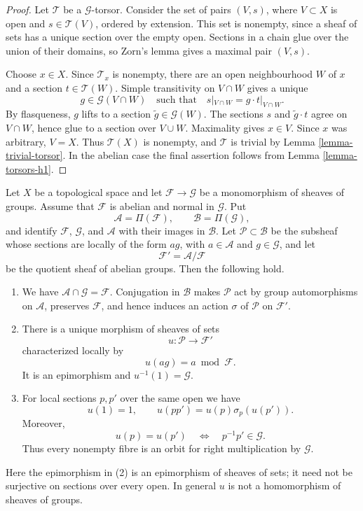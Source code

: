 \begin{proof}
Let $\mathcal T$ be a $\mathcal G$-torsor. Consider the set of pairs
$(V,s)$, where $V\subset X$ is open and $s\in\mathcal T(V)$, ordered by
extension. This set is nonempty, since a sheaf of sets has a unique section
over the empty open. Sections in a chain glue over the union of their
domains, so Zorn's lemma gives a maximal pair $(V,s)$.

Choose $x\in X$. Since $\mathcal T_x$ is nonempty, there are an open
neighbourhood $W$ of $x$ and a section $t\in\mathcal T(W)$. Simple
transitivity on $V\cap W$ gives a unique
$$
g\in\mathcal G(V\cap W)
\quad\text{such that}\quad
s|_{V\cap W}=g\cdot t|_{V\cap W}.
$$
By flasqueness, $g$ lifts to a section $\widetilde g\in\mathcal G(W)$.
The sections $s$ and $\widetilde g\cdot t$ agree on $V\cap W$, hence glue
to a section over $V\cup W$. Maximality gives $x\in V$. Since $x$ was
arbitrary, $V=X$. Thus $\mathcal T(X)$ is nonempty, and $\mathcal T$ is
trivial by Lemma \ref{lemma-trivial-torsor}. In the abelian case the final
assertion follows from Lemma \ref{lemma-torsors-h1}.
\end{proof}

\begin{lemma}
\label{lemma-pointwise-envelope-crossed-homomorphism}
\begin{reference}
\cite[Chapter III, \S 3.4, proof of Proposition 3.4.2,
pp. 162--163]{Tohoku}
\end{reference}
Let $X$ be a topological space and let
$\mathcal F \to \mathcal G$ be a monomorphism of sheaves of groups.
Assume that $\mathcal F$ is abelian and normal in $\mathcal G$. Put
$$
\mathcal A=\Pi(\mathcal F),\qquad
\mathcal B=\Pi(\mathcal G),
$$
and identify $\mathcal F$, $\mathcal G$, and $\mathcal A$ with their
images in $\mathcal B$. Let $\mathcal P\subset\mathcal B$ be the
subsheaf whose sections are locally of the form $ag$, with
$a\in\mathcal A$ and $g\in\mathcal G$, and let
$$
\mathcal F'=\mathcal A/\mathcal F
$$
be the quotient sheaf of abelian groups. Then the following hold.
\begin{enumerate}
\item We have $\mathcal A\cap\mathcal G=\mathcal F$. Conjugation in
$\mathcal B$ makes $\mathcal P$ act by group automorphisms on
$\mathcal A$, preserves $\mathcal F$, and hence induces an action
$\sigma$ of $\mathcal P$ on $\mathcal F'$.
\item There is a unique morphism of sheaves of sets
$$
u:\mathcal P\longrightarrow\mathcal F'
$$
characterized locally by
$$
u(ag)=a\bmod\mathcal F.
$$
It is an epimorphism and $u^{-1}(1)=\mathcal G$.
\item For local sections $p,p'$ over the same open we have
$$
u(1)=1,\qquad
u(pp')=u(p)\sigma_p(u(p')).
$$
Moreover,
$$
u(p)=u(p')\quad\Longleftrightarrow\quad
p^{-1}p'\in\mathcal G.
$$
Thus every nonempty fibre is an orbit for right multiplication by
$\mathcal G$.
\end{enumerate}
Here the epimorphism in (2) is an epimorphism of sheaves of sets; it need
not be surjective on sections over every open. In general $u$ is not a
homomorphism of sheaves of groups.
\end{lemma}

